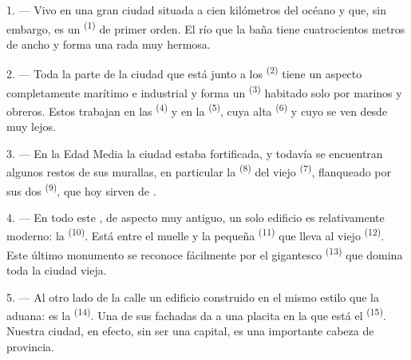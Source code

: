 
\VUsaut{2.0mm}
\VUsaut{3.0mm}
\VUfilet{16mm}
\VUsaut{5.6mm}
\VUsaut{1.4mm}
\VUsaut{2.2mm}

\VUsaut{3.0mm}

1. --- Vivo en una gran ciudad situada a cien kilómetros del océano y que,
sin embargo, es un  \textsuperscript{(1)} de primer orden. El río que
la baña tiene cuatrocientos metros de ancho y forma una rada muy hermosa.

2. --- Toda la parte de la ciudad que está junto a los 
\textsuperscript{(2)} tiene un aspecto completamente marítimo e industrial y forma
un  \textsuperscript{(3)} habitado solo por marinos y obreros. Estos
trabajan en las  \textsuperscript{(4)} y en la 
\textsuperscript{(5)}, cuya alta  \textsuperscript{(6)} y cuyo
 se ven desde muy lejos.

3. --- En la Edad Media la ciudad estaba fortificada, y todavía se
encuentran algunos restos de sus murallas, en particular la
 \textsuperscript{(8)} del viejo 
\textsuperscript{(7)}, flanqueado por sus dos  \textsuperscript{(9)}, que hoy
sirven de .

4. --- En todo este , de aspecto muy antiguo, un solo
edificio es relativamente moderno: la  \textsuperscript{(10)}. Está
entre el muelle y la pequeña  \textsuperscript{(11)} que lleva al viejo
 \textsuperscript{(12)}. Este último monumento se reconoce
fácilmente por el gigantesco  \textsuperscript{(13)} que domina
toda la ciudad vieja.

5. --- Al otro lado de la calle  un edificio construido en el
mismo estilo que la aduana: es la  \textsuperscript{(14)}. Una de sus
fachadas da a una placita en la que está el 
\textsuperscript{(15)}. Nuestra ciudad, en efecto, sin ser una capital, es una
importante cabeza de provincia.


